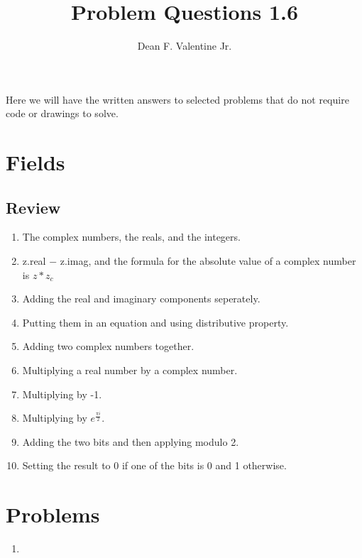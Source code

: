 \documentclass{article}
\title{Problem Questions 1.6}
\author{Dean F. Valentine Jr.}
\begin{document}
    \maketitle
    Here we will have the written answers to selected problems that do not require code or drawings to solve.
    \section{Fields}
    \subsection{}
    \subsection{}
    \subsection{}
    \subsection{}
    \subsection{}
    \subsection{}
    \subsection{Review}
    \begin{enumerate}
        \item The complex numbers, the reals, and the integers.
        \item z.real $-$ z.imag, and the formula for the absolute value of a complex number is $z * z_{c}$
        \item Adding the real and imaginary components seperately.
        \item Putting them in an equation and using distributive property.
        \item Adding two complex numbers together.
        \item Multiplying a real number by a complex number.
        \item Multiplying by -1.
        \item Multiplying by $e^{\frac{{\pi}i}{2}}$.
        \item Adding the two bits and then applying modulo 2.
        \item Setting the result to 0 if one of the bits is 0 and 1 otherwise.
    \end{enumerate}
    \section{Problems}
    \begin{enumerate}
        \item 
    \end{enumerate}
\end{document}
